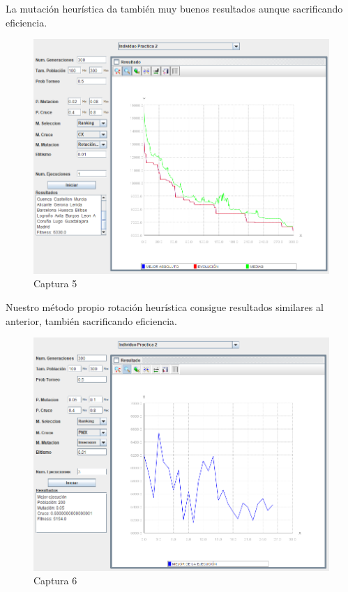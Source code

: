 \documentclass[twoside]{AiTeX}
\begin{document}
La mutación heurística da también muy buenos resultados aunque sacrificando eficiencia.

\begin{figure}[H]
    \centering
    \includegraphics[width = \textwidth]{Images/Captura5.png}
    \caption{Captura 5}
    \label{fig:5}
\end{figure}

Nuestro método propio rotación heurística consigue resultados similares al anterior, también sacrificando eficiencia.

\begin{figure}[H]
    \centering
    \includegraphics[width = \textwidth]{Images/Captura6.png}
    \caption{Captura 6}
    \label{fig:6}
\end{figure}
\end{document}
